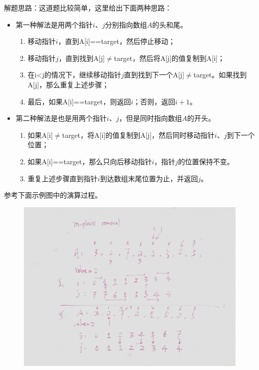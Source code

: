 \documentclass[a4paper,10pt]{article}
\begin{document}
\begin{CJK*}{UTF8}{gbsn}
\noindent 解题思路：这道题比较简单，这里给出下面两种思路：
\begin{itemize}
    \item 第一种解法是用两个指针$i$、$j$分别指向数组$A$的头和尾。
        \begin{enumerate}
            \item 移动指针$i$，直到A[i]==target，然后停止移动；
            \item 移动指针$j$，直到找到A[j]$\neq$target，然后将A[j]的值复制到A[i]；
            \item 在i<j的情况下，继续移动指针$j$直到找到下一个A[j]$\neq$target。如果找到A[j]，那么重复上述步骤；
            \item 最后，如果A[i]==target，则返回$i$；否则，返回$i+1$。
        \end{enumerate}
        
    \item 第二种解法是也是用两个指针$i$、$j$，但是同时指向数组$A$的开头。
        \begin{enumerate}
            \item 如果A[i]$\neq$target，将A[i]的值复制到A[j]，然后同时移动指针$i$、$j$到下一个位置；
            \item 如果A[i]==target，那么只向后移动指针$i$，指针$j$的位置保持不变。
            \item 重复上述步骤直到指针$i$到达数组末尾位置为止，并返回$j$。
        \end{enumerate}
\end{itemize}
\noindent 参考下面示例图中的演算过程。
\end{CJK*}

\begin{figure}[h]
    \includegraphics[width=\textwidth]{leetcode27.jpg}
    \centering \\
\end{figure}
\end{document}
